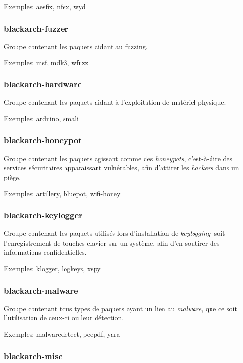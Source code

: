 \documentclass[a4paper, oneside, 11pt]{book}
\begin{document}
Exemples: aesfix, nfex, wyd

\subsubsection{blackarch-fuzzer}

Groupe contenant les paquets aidant au fuzzing.

Exemples: msf, mdk3, wfuzz

\subsubsection{blackarch-hardware}

Groupe contenant les paquets aidant à l'exploitation de matériel physique.

Exemples: arduino, smali

\subsubsection{blackarch-honeypot}

Groupe contenant les paquets agissant comme des \textit{honeypots}, c'est-à-dire
des services sécuritaires apparaissant vulnérables, afin d'attirer les \textit{hackers} dans un piège.

Exemples: artillery, bluepot, wifi-honey

\subsubsection{blackarch-keylogger}

Groupe contenant les paquets utilisés lors d'installation de \textit{keylogging}, 
soit l'enregistrement de touches clavier sur un système, afin d'en soutirer des informations confidentielles.

Exemples: klogger, logkeys, xspy

\subsubsection{blackarch-malware}

Groupe contenant tous types de paquets ayant un lien au \textit{malware}, que ce
soit l'utilisation de ceux-ci ou leur détection.

Exemples: malwaredetect, peepdf, yara

\subsubsection{blackarch-misc}
\end{document}
